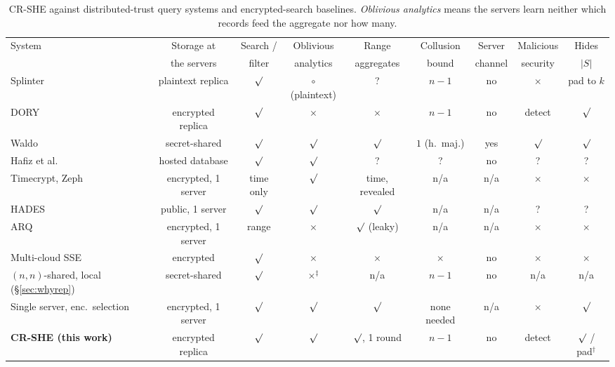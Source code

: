 \documentclass[a4paper,fleqn]{cas-sc}
\providecommand{\checkmark}{\ensuremath{\surd}}
\begin{document}
\begin{table}[pos=t,width=\textwidth]
\caption{CR-SHE against distributed-trust query systems and encrypted-search
baselines. \emph{Oblivious analytics} means the servers learn neither which
records feed the aggregate nor how many.}
\label{tab:compare}
\centering
\scriptsize
\setlength{\tabcolsep}{3pt}
\begin{tabular*}{\tblwidth}{@{\extracolsep{\fill}}lcccccccc@{}}
\toprule
System & Storage at & Search / & Oblivious & Range & Collusion & Server &
Malicious & Hides \\
 & the servers & filter & analytics & aggregates & bound & channel & security &
$|S|$ \\
\midrule
Splinter \citep{splinter} & plaintext replica & $\checkmark$ &
$\circ$ (plaintext) & ? & $n-1$ & no & $\times$ & pad to $k$ \\
DORY \citep{dory} & encrypted replica & $\checkmark$ & $\times$ & $\times$ &
$n-1$ & no & detect & $\checkmark$ \\
Waldo \citep{waldo} & secret-shared & $\checkmark$ & $\checkmark$ &
$\checkmark$ & $1$ (h.\ maj.) & yes & $\checkmark$ & $\checkmark$ \\
Hafiz et al.\ \citep{hafiz2024private} & hosted database & $\checkmark$ &
$\checkmark$ & ? & ? & no & ? & ? \\
Timecrypt, Zeph \citep{timecrypt,zeph} & encrypted, 1 server & time only &
$\checkmark$ & time, revealed & n/a & n/a & $\times$ & $\times$ \\
HADES \citep{liu2025hades} & public, 1 server & $\checkmark$ & $\checkmark$ &
$\checkmark$ & n/a & n/a & ? & ? \\
ARQ \citep{espiritu2022arq} & encrypted, 1 server & range & $\times$ &
$\checkmark$ (leaky) & n/a & n/a & $\times$ & $\times$ \\
Multi-cloud SSE \citep{xu2021privacy} & encrypted & $\checkmark$ & $\times$ &
$\times$ & $\times$ & no & $\times$ & $\times$ \\
\midrule
$(n,n)$-shared, local (\S\ref{sec:whyrep}) & secret-shared & $\checkmark$ &
$\times^{\ddagger}$ & n/a & $n-1$ & no & n/a & n/a \\
Single server, enc.\ selection & encrypted, 1 server & $\checkmark$ &
$\checkmark$ & $\checkmark$ & none needed & n/a & $\times$ & $\checkmark$ \\
\textbf{CR-SHE (this work)} & encrypted replica & $\checkmark$ & $\checkmark$ &
$\checkmark$, 1 round & $n-1$ & no & detect & $\checkmark$ / pad$^{\dagger}$ \\

\end{tabular*}
\end{table}
\end{document}
